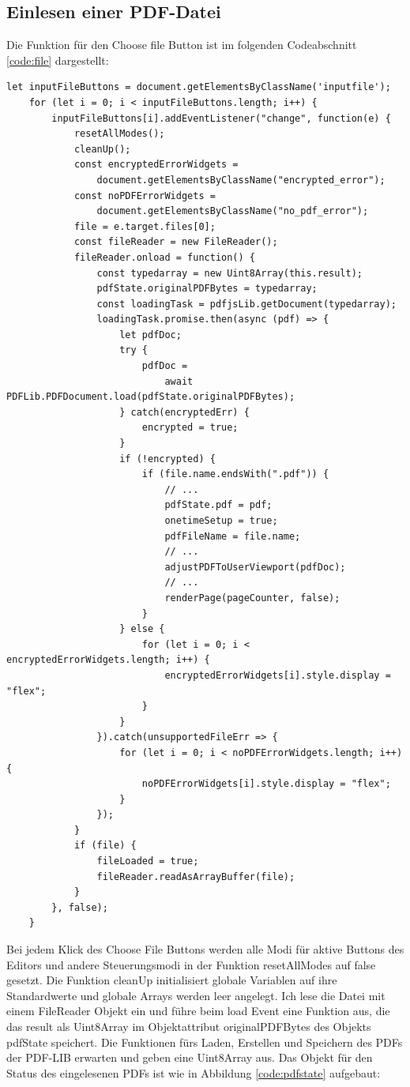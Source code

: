 \subsection{Einlesen einer PDF-Datei}
Die Funktion für den Choose file Button ist im folgenden Codeabschnitt \ref{code:file} dargestellt:

\begin{lstlisting}[style=ES6, caption={Einlesen einer PDF-Datei}, label=code:file]
	let inputFileButtons = document.getElementsByClassName('inputfile');
	for (let i = 0; i < inputFileButtons.length; i++) {
		inputFileButtons[i].addEventListener("change", function(e) {
			resetAllModes();
			cleanUp();
			const encryptedErrorWidgets = 
				document.getElementsByClassName("encrypted_error");
			const noPDFErrorWidgets = 
				document.getElementsByClassName("no_pdf_error");
			file = e.target.files[0];
			const fileReader = new FileReader(); 
			fileReader.onload = function() {
				const typedarray = new Uint8Array(this.result);
				pdfState.originalPDFBytes = typedarray;
				const loadingTask = pdfjsLib.getDocument(typedarray);
				loadingTask.promise.then(async (pdf) => {
					let pdfDoc;
					try {
						pdfDoc = 
							await PDFLib.PDFDocument.load(pdfState.originalPDFBytes);
					} catch(encryptedErr) {
						encrypted = true;
					}
					if (!encrypted) {
						if (file.name.endsWith(".pdf")) {
							// ...
							pdfState.pdf = pdf;
							onetimeSetup = true;
							pdfFileName = file.name;
							// ...
							adjustPDFToUserViewport(pdfDoc);
							// ...
							renderPage(pageCounter, false);
						}
					} else {
						for (let i = 0; i < encryptedErrorWidgets.length; i++) {
							encryptedErrorWidgets[i].style.display = "flex";
						}
					}
				}).catch(unsupportedFileErr => {
					for (let i = 0; i < noPDFErrorWidgets.length; i++) {
						noPDFErrorWidgets[i].style.display = "flex";
					}
				});
			}
			if (file) {
				fileLoaded = true;
				fileReader.readAsArrayBuffer(file);
			}
		}, false);
	}
\end{lstlisting} 

Bei jedem Klick des Choose File Buttons werden alle Modi für aktive Buttons des Editors und andere Steuerungsmodi in der Funktion resetAllModes auf false gesetzt. Die Funktion cleanUp initialisiert globale Variablen auf ihre Standardwerte und globale Arrays werden leer angelegt. Ich lese die Datei mit einem FileReader Objekt ein und führe beim load Event eine Funktion aus, die das result als Uint8Array im Objektattribut originalPDFBytes des Objekts pdfState speichert. Die Funktionen fürs Laden, Erstellen und Speichern des PDFs der PDF-LIB erwarten und geben eine Uint8Array aus. Das Objekt für den Status des eingelesenen PDFs ist wie in Abbildung \ref{code:pdfstate} aufgebaut:

